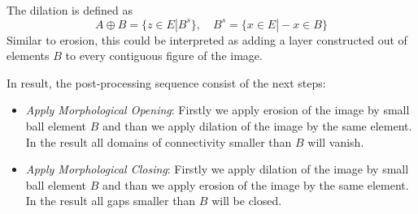 The dilation is defined as 
\begin{equation}
A \oplus B = \{z \in E | B^{s} \}, \quad B^{s}=\{x \in E | -x \in B \}
\end{equation} 
Similar to erosion, this could be interpreted as adding a layer constructed out of elements $B$ to every contiguous figure of the image. 


In result, the post-processing sequence consist of the next steps:
\begin{itemize}
	\item \textit{Apply Morphological Opening}: Firstly we apply erosion of the image by small ball element $B$ and than we apply dilation of the image by the same element. In the result all domains of connectivity smaller than $B$ will vanish.
	\item \textit{Apply Morphological Closing}: Firstly we apply dilation of the image by small ball element $B$ and than we apply erosion of the image by the same element. In the result all gaps smaller than $B$ will be closed.
\end{itemize}



 